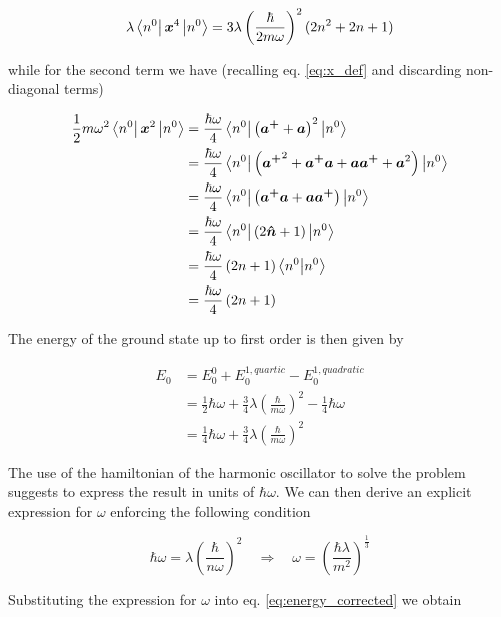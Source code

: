 \documentclass{article}
\begin{document}
\begin{equation}
\lambda \bra{n^0}\bm{x}^4 \ket{n^0} = 3 \lambda \left( \frac{\hbar}{2m \omega} \right)^2 (2n^2 + 2n +1)
\end{equation}

while for the second term we have (recalling eq. \eqref{eq:x_def} and discarding non-diagonal terms)

\begin{align}
\frac{1}{2} m \omega^2 \bra{n^0} \bm{x}^2 \ket{n^0} & = \frac{\hbar\omega}{4} \bra{n^0} \left( \bm{a^+} + \bm{a} \right)^2 \ket{n^0} \nonumber \\
& = \frac{\hbar\omega}{4} \bra{n^0} \left( {\bm{a^+}}^2 + \bm{a^+}\bm{a} + \bm{a}\bm{{a}^+} + \bm{a}^2 \right) \ket{n^0} \nonumber \\
& = \frac{\hbar\omega}{4} \bra{n^0} \left(\bm{a^+}\bm{a} + \bm{a}\bm{{a}^+}\right) \ket{n^0} \nonumber \\
& = \frac{\hbar\omega}{4} \bra{n^0} \left(2\bm{\hat{n}} + 1\right) \ket{n^0} \nonumber \\
& = \frac{\hbar\omega}{4} \left(2n + 1\right) \braket{n^0}{n^0} \nonumber \\
& = \frac{\hbar\omega}{4} \left(2n + 1\right)
\end{align}

The energy of the ground state up to first order is then given by

\begin{align}
\label{eq:energy_corrected}
E_0 & = E_0^0 + E_0^{1,quartic} - E_0^{1,quadratic} \nonumber \\
& = \frac{1}{2} \hbar \omega + \frac{3}{4} \lambda \left(\frac{\hbar}{m\omega} \right)^2 - \frac{1}{4} \hbar \omega \nonumber \\
& = \frac{1}{4} \hbar \omega + \frac{3}{4} \lambda \left(\frac{\hbar}{m\omega} \right)^2
\end{align}

The use of the hamiltonian of the harmonic oscillator to solve the problem suggests to express the result in units of \( \hbar \omega \). We can then derive an explicit expression for \( \omega \) enforcing the following condition

\begin{equation}
\hbar \omega = \lambda \left( \frac{\hbar}{n \omega} \right)^2 \quad \Rightarrow \quad \omega = \left( \frac{\hbar \lambda}{m^2} \right)^{\frac{1}{3}}
\end{equation}

Substituting the expression for \( \omega \) into eq. \eqref{eq:energy_corrected} we obtain
\end{document}
